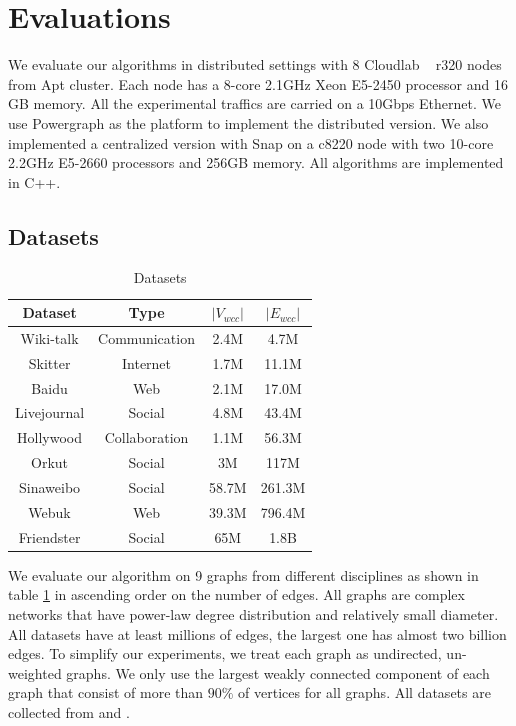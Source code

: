 \section{Evaluations}
\label{evaluation}

We evaluate our algorithms in distributed settings with 8 Cloudlab ~\cite{RicciEide:login14} r320 nodes from Apt cluster. Each node has a 8-core 2.1GHz Xeon E5-2450 processor and 16 GB memory. All the experimental traffics are carried on a 10Gbps Ethernet. We use Powergraph \cite{180251} as the platform to implement the distributed version. We also implemented a centralized version with Snap \cite{snapnets} on a c8220 node with two 10-core 2.2GHz E5-2660 processors and 256GB memory. All algorithms are implemented in C++.

\subsection{Datasets}

\begin{table}
    \centering
    \begin{tabular}{|c|c|c|c|} \hline
        Dataset & Type & $|V_{wcc}|$ & $|E_{wcc}|$ \\ \hline
				Wiki-talk & Communication & 2.4M & 4.7M \\ \hline
        Skitter & Internet & 1.7M & 11.1M \\ \hline
				Baidu & Web & 2.1M & 17.0M \\ \hline
        Livejournal & Social & 4.8M & 43.4M \\ \hline
				Hollywood & Collaboration & 1.1M & 56.3M \\ \hline
        Orkut & Social & 3M & 117M \\ \hline
				Sinaweibo & Social & 58.7M & 261.3M \\ \hline
				Webuk & Web & 39.3M & 796.4M \\ \hline
        Friendster & Social & 65M & 1.8B \\ \hline
    \end{tabular}
    \caption{Datasets}
    \label{table:datasets}
\end{table}

We evaluate our algorithm on 9 graphs from different disciplines as shown in table \ref{table:datasets} in ascending order on the number of edges. All graphs are complex networks that have power-law degree distribution and relatively small diameter. All datasets have at least millions of edges, the largest one has almost two billion edges. To simplify our experiments, we treat each graph as undirected, un-weighted graphs. We only use the largest weakly connected component of each graph that consist of more than $90\%$ of vertices for all graphs. All datasets are collected from \cite{snapnets} and \cite{nr}.

